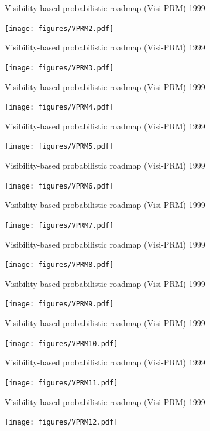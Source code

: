 \begin{frame} {Visibility-based probabilistic roadmap (Visi-PRM) 1999}
\centerline {
  \texttt{[image: figures/VPRM2.pdf]}
}
\end{frame}

\begin{frame} {Visibility-based probabilistic roadmap (Visi-PRM) 1999}
\centerline {
  \texttt{[image: figures/VPRM3.pdf]}
}
\end{frame}

\begin{frame} {Visibility-based probabilistic roadmap (Visi-PRM) 1999}
\centerline {
  \texttt{[image: figures/VPRM4.pdf]}
}
\end{frame}

\begin{frame} {Visibility-based probabilistic roadmap (Visi-PRM) 1999}
\centerline {
  \texttt{[image: figures/VPRM5.pdf]}
}
\end{frame}

\begin{frame} {Visibility-based probabilistic roadmap (Visi-PRM) 1999}
\centerline {
  \texttt{[image: figures/VPRM6.pdf]}
}
\end{frame}

\begin{frame} {Visibility-based probabilistic roadmap (Visi-PRM) 1999}
\centerline {
  \texttt{[image: figures/VPRM7.pdf]}
}
\end{frame}

\begin{frame} {Visibility-based probabilistic roadmap (Visi-PRM) 1999}
\centerline {
  \texttt{[image: figures/VPRM8.pdf]}
}
\end{frame}

\begin{frame} {Visibility-based probabilistic roadmap (Visi-PRM) 1999}
\centerline {
  \texttt{[image: figures/VPRM9.pdf]}
}
\end{frame}

\begin{frame} {Visibility-based probabilistic roadmap (Visi-PRM) 1999}
\centerline {
  \texttt{[image: figures/VPRM10.pdf]}
}
\end{frame}

\begin{frame} {Visibility-based probabilistic roadmap (Visi-PRM) 1999}
\centerline {
  \texttt{[image: figures/VPRM11.pdf]}
}
\end{frame}

\begin{frame} {Visibility-based probabilistic roadmap (Visi-PRM) 1999}
\centerline {
  \texttt{[image: figures/VPRM12.pdf]}
}
\end{frame}


